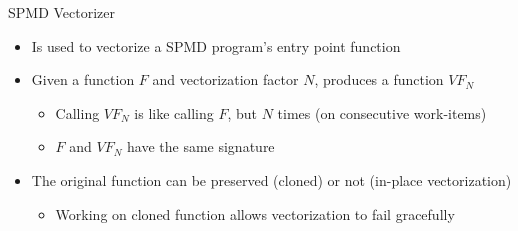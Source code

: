 \begin{frame}{SPMD Vectorizer}

\begin{minipage}[t]{0.45\linewidth}

\begin{itemize}
    \item Is used to vectorize a SPMD program's entry point function
    \item Given a function $F$ and vectorization factor $N$, produces a function $VF_N$
    \begin{itemize}
        \item Calling $VF_N$ is like calling $F$, but $N$ times (on consecutive work-items)
        \item $F$ and $VF_N$ have the same signature
    \end{itemize}
    
    \item The original function can be preserved (cloned) or not (in-place vectorization)
    \begin{itemize}
        \item Working on cloned function allows vectorization to fail gracefully
    \end{itemize}
    
\end{itemize}

\end{minipage}
\hspace{1em}
\begin{minipage}[t]{0.48\linewidth}

\vspace{0.1ex}

\end{minipage}

\end{frame}


